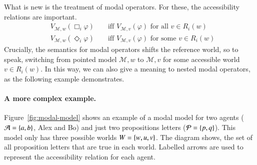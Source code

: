 \documentclass[nobib,nofonts]{tufte-handout}
\renewcommand{\phi}{\ensuremath{\varphi}}
\newcommand{\Model}{\ensuremath{\mathcal{M}}}
\begin{document}
\noindent What is new is the treatment of modal operators.
For these, the accessibility relations are important.
%
\begin{align*}
    & V_{\Model, w}(\Box_i \phi) & & \text{ \ iff \ } V_{\Model, v}(\phi) \text{ for all $v \in R_i(w)$} \\
    & V_{\Model, w}(\Diamond_i \phi) & & \text{ \ iff \ } V_{\Model, v}(\phi) \text{ for some $v \in R_i(w)$}
\end{align*}
%
Crucially, the semantics for modal operators shifts the reference world, so to speak, switching from pointed model $\Model, w$ to $\Model, v$ for some accessible world $v \in R_{i}(w)$.
In this way, we can also give a meaning to nested modal operators, as the following example demonstrates.

\paragraph{A more complex example.}
Figure~\ref{fig:modal-model} shows an example of a modal model for two agents ($\mathcal{A} = \left\{a,b\right\}$, Alex and Bo) and just two propositions letters ($\mathcal{P} = \left\{p, q\right\}$).
This model only has three possible worlds $W = \left\{w,u,v\right\}$.
The diagram shows, the set of all proposition letters that are true in each world.
Labelled arrows are used to represent the accessibility relation for each agent.
\end{document}
